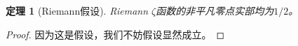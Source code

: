 \begin{texcode}[emph={[2]amsthm},emph={[1]theorem,document,proof}]
\usepackage{amsthm}
\newtheorem{theorem}{定理}

    \begin{theorem}[Riemann假设]
        Riemann $\zeta$函数的非平凡零点实部均为$1/2$。
    \end{theorem}

    \begin{proof}
        因为这是假设，我们不妨假设显然成立。
    \end{proof}

\end{texcode}